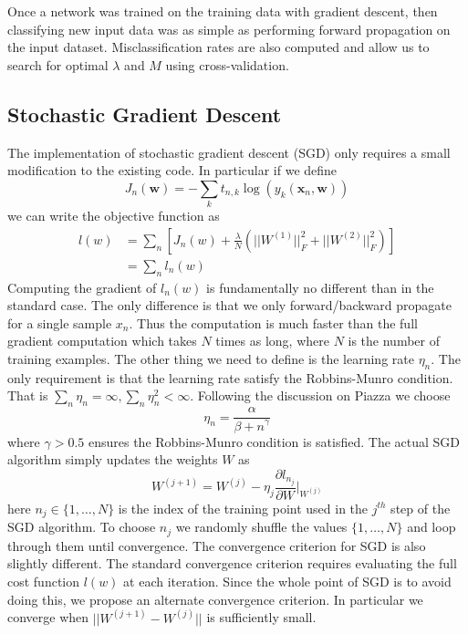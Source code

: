\documentclass[10pt]{article}
\begin{document}
Once a network was trained on the training data with gradient descent, then classifying new input data was as simple as performing forward propagation on the input dataset.  Misclassification rates are also computed and allow us to search for optimal $\lambda$ and $M$ using cross-validation.

\subsection*{Stochastic Gradient Descent}
The implementation of stochastic gradient descent (SGD) only requires a small modification to the existing code. In particular if we define
%
%
\begin{equation}
J_n(\mathbf{w}) = -\sum_k t_{n,k} \log(y_k(\mathbf{x}_n,\mathbf{w}))
\end{equation}
%
we can write the objective function as 
%
%
\begin{align}
l(w) &= \sum_n \left[ J_n(w) + \frac{\lambda}{N} (||W^{(1)}||^2_F + ||W^{(2)}||^2_F) \right] \\
& = \sum_n l_n(w)
\end{align}
%
%
Computing the gradient of $l_n(w)$ is fundamentally no different than in the standard case. The only difference is that we only forward/backward propagate for a single sample $x_n$. Thus the computation is much faster than the full gradient computation which takes $N$ times as long, where $N$ is the number of training examples. The other thing we need to define is the learning rate $\eta_n$. The only requirement is that the learning rate satisfy the Robbins-Munro condition. That is $\sum_n \eta_n = \infty, \sum_n \eta_n^2 < \infty$. Following the discussion on Piazza we choose
%
%
\begin{equation}
\eta_n = \frac{\alpha}{{\beta + n}^\gamma}
\end{equation}
%
%
where $\gamma > 0.5$ ensures the Robbins-Munro condition is satisfied. The actual SGD algorithm simply updates the weights $W$ as 
%
%
\begin{equation}
W^{(j+1)} = W^{(j)} - \eta_j \frac{\partial l_{n_j}}{\partial W}|_{W^{(j)}}
\end{equation}
%
%
here $n_j \in \{1,\ldots,N\}$ is the index of the training point used in the $j^{th}$ step of the SGD algorithm. To choose $n_j$ we randomly shuffle the values $\{1,\ldots,N\}$ and loop through them until convergence. The convergence criterion for SGD is also slightly different. The standard convergence criterion requires evaluating the full cost function $l(w)$ at each iteration. Since the whole point of SGD is to avoid doing this, we propose an alternate convergence criterion. In particular we converge when $||W^{(j+1)} - W^{(j)}||$ is sufficiently small. 
\end{document}
